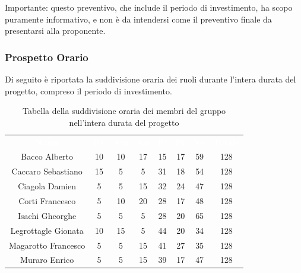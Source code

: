 Importante: questo preventivo, che include il periodo di investimento, ha scopo puramente informativo, e non è da intendersi come il preventivo finale da presentarsi alla proponente.
\subsubsection{Prospetto Orario}
Di seguito è riportata la suddivisione oraria dei ruoli durante l'intera durata del progetto, compreso il periodo di investimento.




\begin{table}[H]	
	\begin{center}
	    \begin{tabular}{cccccccc}
			\rowcolor{greySWEight}
			\textcolor{white}{\textbf{Nome}} & \textcolor{white}{\textbf{Re}} & \textcolor{white}{\textbf{Am}} & \textcolor{white}{\textbf{An}} & \textcolor{white}{\textbf{Pj}} & \textcolor{white}{\textbf{Pr}} & \textcolor{white}{\textbf{Ve}} & \textcolor{white}{\textbf{Totale}}
			\\
			Bacco Alberto & 10 & 10 & 17 & 15 & 17 & 59 & 128 \\
			Caccaro Sebastiano & 15 & 5 & 5 & 31 & 18 & 54 & 128 \\
			Ciagola Damien & 5 & 5 & 15 & 32 & 24 & 47 & 128 \\
			Corti Francesco & 5 & 10 & 20 & 28 & 17 & 48 & 128 \\
			Isachi Gheorghe & 5 & 5 & 5 & 28 & 20 & 65 & 128 \\
			Legrottagle Gionata & 10 & 15 & 5 & 44 & 20 & 34 & 128 \\
			Magarotto Francesco & 5 & 5 & 15 & 41 & 27 & 35 & 128 \\
			Muraro Enrico & 5 & 5 & 15 & 39 & 17 & 47 & 128 \\
						\end{tabular}
	    \caption{Tabella della suddivisione oraria dei membri del gruppo nell'intera durata del progetto} \label{tab:tabellaProgInt} 
	\end{center}
\end{table}


